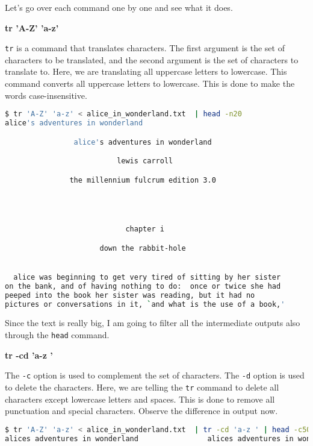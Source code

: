 Let's go over each command one by one and see what it does.

\textbf{tr 'A-Z' 'a-z'}

\texttt{tr} is a command that translates characters. The first argument
is the set of characters to be translated, and the second argument is
the set of characters to translate to. Here, we are translating all
uppercase letters to lowercase.
This command converts all uppercase letters to lowercase. This is done
to make the words case-insensitive.

\begin{lstlisting}[language=bash]
$ tr 'A-Z' 'a-z' < alice_in_wonderland.txt  | head -n20
alice's adventures in wonderland

                alice's adventures in wonderland

                          lewis carroll

               the millennium fulcrum edition 3.0




                            chapter i

                      down the rabbit-hole


  alice was beginning to get very tired of sitting by her sister
on the bank, and of having nothing to do:  once or twice she had
peeped into the book her sister was reading, but it had no
pictures or conversations in it, `and what is the use of a book,'
\end{lstlisting}

\begin{remark}
  Since the text is really big, I am  going to filter all the
  intermediate outputs also through the \texttt{head} command.
\end{remark}

\textbf{tr -cd 'a-z '}

The \texttt{-c} option is used to complement the set of characters.
The \texttt{-d} option is used to delete the characters. Here, we are
telling the \texttt{tr} command to delete all characters except lowercase
letters and spaces. This is done to remove all punctuation and special
characters. Observe the difference in output now.

\begin{lstlisting}[language=bash]
$ tr 'A-Z' 'a-z' < alice_in_wonderland.txt  | tr -cd 'a-z ' | head -c500
alices adventures in wonderland                alices adventures in wonderland                          lewis carroll               the millennium fulcrum edition                             chapter i                      down the rabbithole  alice was beginning to get very tired of sitting by her sisteron the bank and of having nothing to do  once or twice she hadpeeped into the book her sister was reading but it had nopictures or conversations in it and what is the use of a bookthought alice w
\end{lstlisting}

